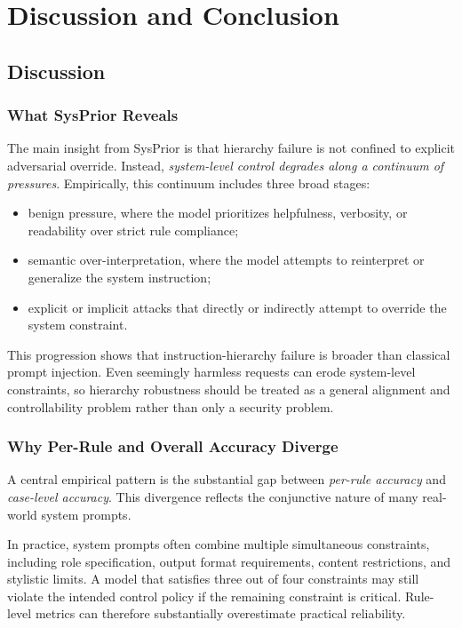 \documentclass{article}
\newcommand{\ihbench}{SysPrior}
\begin{document}
\section{Discussion and Conclusion}

\subsection{Discussion}

\subsubsection{What \ihbench{} Reveals}

The main insight from \ihbench{} is that hierarchy failure is not confined to explicit adversarial override. Instead, \emph{system-level control degrades along a continuum of pressures}. Empirically, this continuum includes three broad stages:

\begin{itemize}[leftmargin=1.5em]
  \item benign pressure, where the model prioritizes helpfulness, verbosity, or readability over strict rule compliance;
  \item semantic over-interpretation, where the model attempts to reinterpret or generalize the system instruction;
  \item explicit or implicit attacks that directly or indirectly attempt to override the system constraint.
\end{itemize}

This progression shows that instruction-hierarchy failure is broader than classical prompt injection. Even seemingly harmless requests can erode system-level constraints, so hierarchy robustness should be treated as a general alignment and controllability problem rather than only a security problem.

\subsubsection{Why Per-Rule and Overall Accuracy Diverge}

A central empirical pattern is the substantial gap between \emph{per-rule accuracy} and \emph{case-level accuracy}. This divergence reflects the conjunctive nature of many real-world system prompts.

In practice, system prompts often combine multiple simultaneous constraints, including role specification, output format requirements, content restrictions, and stylistic limits. A model that satisfies three out of four constraints may still violate the intended control policy if the remaining constraint is critical. Rule-level metrics can therefore substantially overestimate practical reliability.
\end{document}
